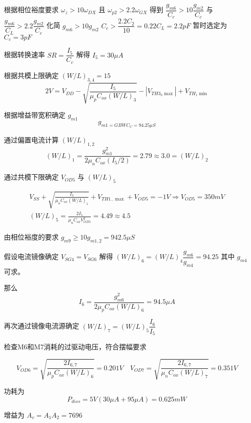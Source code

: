 \documentclass[cn,11pt,chinese,black,simple]{../elegantbook}
\begin{document}
\begin{solution}
    根据相位裕度要求 \(\omega_z > 10 \omega_{DX}\) 且 \(\omega_{p2} > 2.2 \omega_{GX}\)
    得到 \(\dfrac{g_{m6}}{C_c} > 10 \dfrac{g_{m2}}{C_c}\) 与 \(\dfrac{g_{m6}}{C_L} > 2.2 \dfrac{g_{m2}}{C_c}\) 
    化简 \(g_{m6} > 10 g_{m2}\) \(C_c > \dfrac{2.2 C_2}{10} = 0.22 C_L = 2.2 pF\)
    暂时选定为 \(C_c = 3 pF\)


    根据转换速率 \(SR = \dfrac{I_5}{C_c}\) 解得 \(I_5 = 30 \mu A\)

    根据共模上限确定 \((W/L)_{3,4} = 15\) \[2 V = V_{D D}-\sqrt{\frac{I_{5}}{\mu_{p} C_{o x}(W / L)_{3}}}-\left|V_{T H 3_{3} \max }\right|+V_{T H_{1} \min }\]

    根据增益带宽积确定 \(g_{m1}\) 
    \[g_{m1 = GBW  C_C = 94.25 \mu S}\]

    通过偏置电流计算 \((W/L)_{1,2}\)
    \[(W / L)_{1}=\frac{g_{m 1}^{2}}{2 \mu_{n} C_{o x}\left(I_{5} / 2\right)}=2.79 \approx 3.0=(W / L)_{2}\]

    通过共模下限确定 \(V_{OD5}\) 与 \((W/L)_5\)

    \[\begin{array}{l}
        V_{S S}+\sqrt{\frac{I_{5}}{\mu_{n} C_{o x}(W / L)_{1}}}+V_{T H 1_{-} \max }+V_{O D 5}=-1 V \Rightarrow V_{O D 5}=350 mV \\
        (W / L)_{5}=\frac{2 I_{5}}{\mu_{n} C_{o x} V_{O D 5}^{2}}=4.49 \approx 4.5
    \end{array}\]

    由相位裕度的要求 \(g_{m9} \geq 10 g_{m1,2} = 942.5 \mu S\)

    假设电流镜像确定 \(V_{SG4} = V_{SG6}\) 解得 \((W/L)_6 = (W/L)_4  \dfrac{g_{m6}}{g_{m4}} = 94.25\)
    其中 \(g_{m4}\) 可求。

    那么 \[I_6 = \dfrac{g_{m6}^2}{2 \mu_p C_{ox} (W/L)_6} = 94.5 \mu A\]

    再次通过镜像电流源确定 \((W/L)_7 = (W/L)_5 \dfrac{I_6}{I_5}\)

    检查M6和M7消耗的过驱动电压，符合摆幅要求

    \[V_{O D 6}=\sqrt{\frac{2 I_{6,7}}{\mu_{p} C_{o x}(W / L)_{6}}}=0.201 V \quad V_{O D 7}=\sqrt{\frac{2 I_{6,7}}{\mu_{n} C_{o x}(W / L)_{7}}}=0.351 V\]

    功耗为 \[P_{diss} = 5 V (30 \mu A + 95 \mu A) = 0.625 mW\]

    增益为 \(A_v = A_1 A_2 = 7696\)

\end{solution}





\ifx\mainclass\undefined
\end{document}
